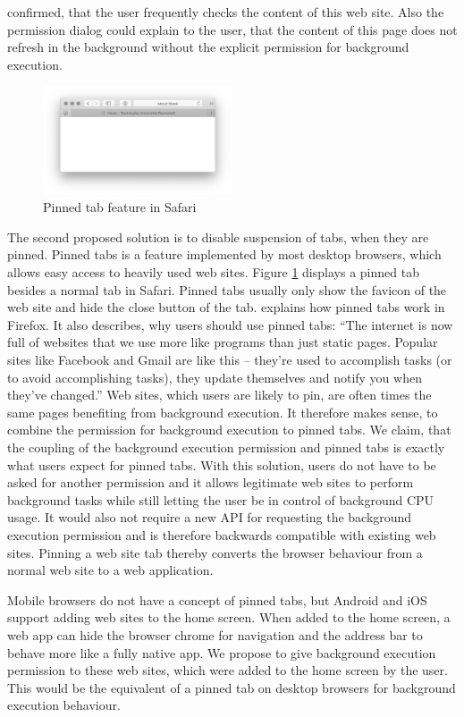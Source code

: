 \documentclass[
	ruledheaders=section,%
	class=report,%
	thesis={type=bachelor},%
	accentcolor=9c,%
	custommargins=true,%
	marginpar=false,%
	parskip=half-,%
	fontsize=11pt,%
]{tudapub}
\begin{document}
confirmed, that the user frequently checks the content of this web site. Also the permission dialog could explain to the user, that the content of this page does not refresh in the background without the explicit permission for background execution.

  \begin{figure}
    \centering
    \includegraphics[width=0.5\textwidth]{images/pinned-tab.png}
    \caption{Pinned tab feature in Safari}
    \label{fig:pinned-tab}
  \end{figure}
  
  The second proposed solution is to disable suspension of tabs, when they are pinned. Pinned tabs is a feature implemented by most desktop browsers, which allows easy access to heavily used web sites. Figure \ref{fig:pinned-tab} displays a pinned tab besides a normal tab in Safari. Pinned tabs usually only show the favicon of the web site and hide the close button of the tab. \cite{firefox-pinned-tabs} explains how pinned tabs work in Firefox. It also describes, why users should use pinned tabs: ``The internet is now full of websites that we use more like programs than just static pages. Popular sites like Facebook and Gmail are like this – they're used to accomplish tasks (or to avoid accomplishing tasks), they update themselves and notify you when they've changed.'' Web sites, which users are likely to pin, are often times the same pages benefiting from background execution. It therefore makes sense, to combine the permission for background execution to pinned tabs. We claim, that the coupling of the background execution permission and pinned tabs is exactly what users expect for pinned tabs. With this solution, users do not have to be asked for another permission and it allows legitimate web sites to perform background tasks while still letting the user be in control of background CPU usage. It would also not require a new API for requesting the background execution permission and is therefore backwards compatible with existing web sites. Pinning a web site tab thereby converts the browser behaviour from a normal web site to a web application.

  Mobile browsers do not have a concept of pinned tabs, but Android and iOS support adding web sites to the home screen. When added to the home screen, a web app can hide the browser chrome for navigation and the address bar to behave more like a fully native app. We propose to give background execution permission to these web sites, which were added to the home screen by the user. This would be the equivalent of a pinned tab on desktop browsers for background execution behaviour.
  

  
  \newpage
  \printbibliography[heading=bibnumbered]


  \affidavit
\end{document}
